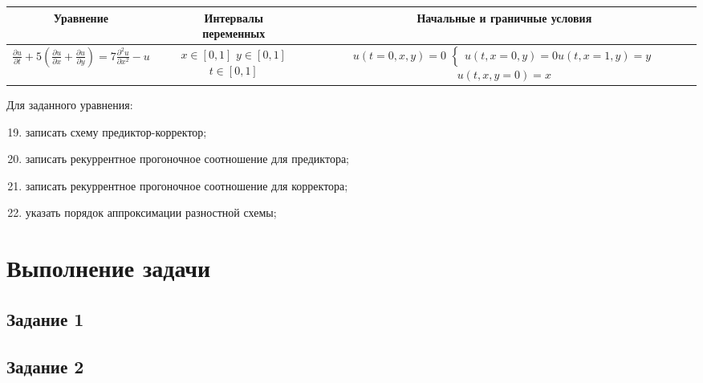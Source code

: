 \documentclass[12pt, a4paper]{report}
\begin{document}
	\begin{center}
		\begin{tabular}{||c|c|c||}
			\hline
			Уравнение & \makecell{Интервалы \\ переменных} & Начальные и граничные условия \\

			\hline
			\small 
			$ \frac{\partial u}{\partial t} + 5(\frac{\partial u}{\partial x} + \frac{\partial u}{\partial y}) = 7\frac{\partial^{2} u}{\partial x^{2}} - u $ & \makecell{$ x \in [0, 1] $ \\ $ y \in [0, 1] $ \\ $ t \in [0, 1] $} & \makecell{$ u(t = 0, x, y) = 0 $ \\ $\begin{cases} u(t, x = 0, y) = 0 \\ u(t, x = 1, y) = y \end{cases}$ \\ $u(t, x, y = 0) = x$} \\

			\hline
		\end{tabular}
	\end{center}
	\par
	Для заданного уравнения:
	\begin{enumerate}
		\setcounter{enumi}{18}
		\item записать схему предиктор-корректор;
		\item записать рекуррентное прогоночное соотношение для предиктора;
		\item записать рекуррентное прогоночное соотношение для корректора;
		\item указать порядок аппроксимации разностной схемы;
	\end{enumerate}

	\newpage

	\section*{Выполнение задачи}

	\subsection*{Задание 1}
	\large

	\subsection*{Задание 2}
	\large
\end{document}
